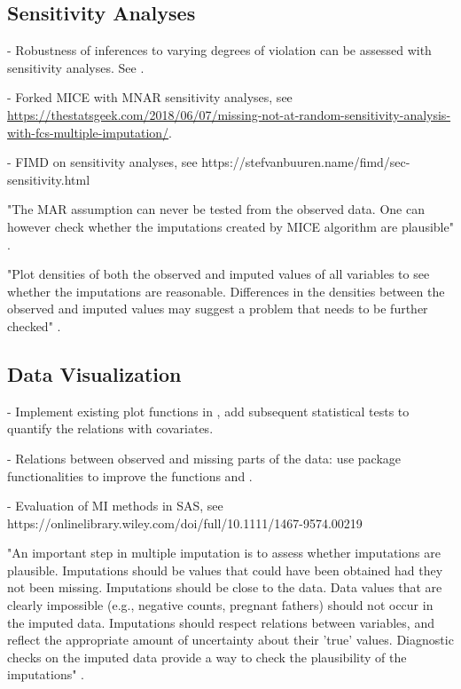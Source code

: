\documentclass[article]{jss}
\newcommand{\fct}[1]{\code{#1()}}
\begin{document}


\subsection{Sensitivity Analyses} \label{sec:sensitivity}

- Robustness of inferences to varying degrees of violation can be assessed with sensitivity analyses. See \citep{nguy17}.

- Forked MICE with MNAR sensitivity analyses, see \url{https://thestatsgeek.com/2018/06/07/missing-not-at-random-sensitivity-analysis-with-fcs-multiple-imputation/}.

- FIMD on sensitivity analyses, see https://stefvanbuuren.name/fimd/sec-sensitivity.html

"The MAR assumption can never be tested from the observed data. One can however check whether the imputations created by MICE algorithm are plausible" \cite[p.~42]{mice}. 

"Plot densities of both the observed and imputed values of all variables to see whether the imputations are reasonable. Differences in the densities between the observed and imputed values may suggest a problem that needs to be further checked" \cite[p.~43]{mice}. 


\subsection{Data Visualization} \label{sec:visualization}

- Implement existing plot functions in , add subsequent statistical tests to quantify the relations with covariates.

- Relations between observed and missing parts of the data: use  package functionalities to improve the  functions \fct{hist} and \fct{xyplot}.

- Evaluation of MI methods in SAS, see https://onlinelibrary.wiley.com/doi/full/10.1111/1467-9574.00219

"An important step in multiple imputation is to assess whether imputations are plausible. Imputations should be values that could have been obtained had they not been missing. Imputations should be close to the data. Data values that are clearly impossible (e.g., negative counts, pregnant fathers) should not occur in the imputed data. Imputations should respect relations between variables, and reflect the appropriate amount of uncertainty about their 'true' values. Diagnostic checks on the imputed data provide a way to check the plausibility of the imputations" \cite[p.~11]{mice}.
\end{document}
